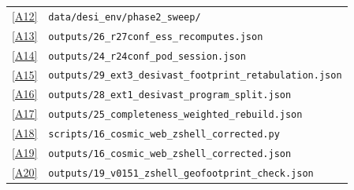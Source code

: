 \documentclass[twocolumn,linenumbers]{aastex702}
\newcommand{\repoBase}{https://github.com/Hubify-Projects/bigbounce/blob/main}
\begin{document}
\begin{table}[p]
{\begin{ruledtabular}
\begin{tabular}{lp{}}
\href{\repoBase/pipelines/p5\_desi\_chirality/data/desi\_env/phase2\_sweep}{[A12]} & \texttt{data/desi\_env/phase2\_sweep/} \\
\href{\repoBase/pipelines/p5\_desi\_chirality/outputs/26\_r27conf\_ess\_recomputes.json}{[A13]} & \texttt{outputs/26\_r27conf\_ess\_recomputes.json} \\
\href{\repoBase/pipelines/p5\_desi\_chirality/outputs/24\_r24conf\_pod\_session.json}{[A14]} & \texttt{outputs/24\_r24conf\_pod\_session.json} \\
\href{\repoBase/pipelines/p5\_desi\_chirality/outputs/29\_ext3\_desivast\_footprint\_retabulation.json}{[A15]} & \texttt{outputs/29\_ext3\_desivast\_footprint\_retabulation.json} \\
\href{\repoBase/pipelines/p5\_desi\_chirality/outputs/28\_ext1\_desivast\_program\_split.json}{[A16]} & \texttt{outputs/28\_ext1\_desivast\_program\_split.json} \\
\href{\repoBase/pipelines/p5\_desi\_chirality/outputs/25\_completeness\_weighted\_rebuild.json}{[A17]} & \texttt{outputs/25\_completeness\_weighted\_rebuild.json} \\
\href{\repoBase/pipelines/p5\_desi\_chirality/scripts/16\_cosmic\_web\_zshell\_corrected.py}{[A18]} & \texttt{scripts/16\_cosmic\_web\_zshell\_corrected.py} \\
\href{\repoBase/pipelines/p5\_desi\_chirality/outputs/16\_cosmic\_web\_zshell\_corrected.json}{[A19]} & \texttt{outputs/16\_cosmic\_web\_zshell\_corrected.json} \\
\href{\repoBase/pipelines/p5\_desi\_chirality/outputs/19\_v0151\_zshell\_geofootprint\_check.json}{[A20]} & \texttt{outputs/19\_v0151\_zshell\_geofootprint\_check.json} \\
\end{tabular}
\end{ruledtabular}
}%
\end{table}
\end{document}
